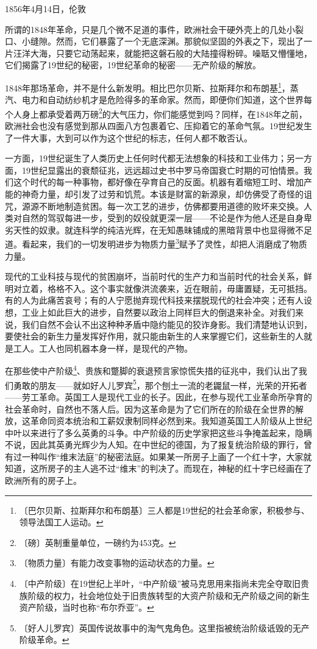 \documentclass[12pt,UTF-8,openany]{ctexbook}
\begin{document}
\begin{large}
    
    \begin{center}1856年4月14日，伦敦\end{center}
    
    所谓的1848年革命，只是几个微不足道的事件，欧洲社会干硬外壳上的几处小裂口、小缝隙。然而，它们暴露了一个无底深渊。那貌似坚固的外表之下，现出了一片汪洋大海，只要它动荡起来，就能把这磐石般的大陆撞得粉碎。噪聒又懵懂地，它们揭露了19世纪的秘密，19世纪革命的秘密——无产阶级的解放。
    
    1848年那场革命，并不是什么新发明。相比巴尔贝斯、拉斯拜尔和布朗基\footnote{〔巴尔贝斯、拉斯拜尔和布朗基〕三人都是19世纪的社会革命家，积极参与、领导法国工人运动。}，蒸汽、电力和自动纺纱机才是危险得多的革命家。然而，即便你们知道，这个世界每个人身上都承受着两万磅\footnote{〔磅〕英制重量单位，一磅约为453克。}的大气压力，你们能感觉到吗？同样，在1848年之前，欧洲社会也没有感觉到那从四面八方包裹着它、压抑着它的革命气氛。19世纪发生了一件大事，大到可以作为这个世纪的标志，任何人都不敢否认。
    
    一方面，19世纪诞生了人类历史上任何时代都无法想象的科技和工业伟力；另一方面，19世纪显露出的衰颓征兆，远远超过史书中罗马帝国衰亡时期的可怕情景。我们这个时代的每一种事物，都好像在孕育自己的反面。机器有着缩短工时、增加产能的神奇力量，却引发了过劳和饥荒。本该是财富的新源泉，却仿佛受了奇怪的诅咒，源源不断地制造贫困。每一次工艺的进步，仿佛都要用道德的败坏来交换。人类对自然的驾驭每进一步，受到的奴役就更深一层——不论是作为他人还是自身卑劣天性的奴隶。就连科学的纯洁光辉，在无知愚昧铺成的黑暗背景中也显得微不足道。看起来，我们的一切发明进步为物质力量\footnote{〔物质力量〕有能力改变事物的运动状态的力量。}赋予了灵性，却把人消磨成了物质力量。
    
    现代的工业科技与现代的贫困崩坏，当前时代的生产力和当前时代的社会关系，鲜明对立着，格格不入。这个事实就像洪流袭来，近在眼前，毋庸置疑，无可抵挡。有的人为此痛苦哀号；有的人宁愿抛弃现代科技来摆脱现代的社会冲突；还有人设想，工业上如此巨大的进步，自然要以政治上同样巨大的倒退来补全。对我们来说，我们自然不会认不出这种种矛盾中隐约能见的狡诈身影。我们清楚地认识到，要使社会的新生力量发挥好作用，就只能由新生的人来掌握它们，这些新生的人就是工人。工人也同机器本身一样，是现代的产物。
    
    在那些使中产阶级\footnote{〔中产阶级〕在19世纪上半叶，“中产阶级”被马克思用来指尚未完全夺取旧贵族阶级的权力，社会地位处于旧贵族转型的大资产阶级和无产阶级之间的新生资产阶级，当时也称“布尔乔亚”。}、贵族和蹩脚的衰退预言家惊慌失措的征兆中，我们认出了我们勇敢的朋友——就如好人儿罗宾\footnote{〔好人儿罗宾〕英国传说故事中的淘气鬼角色。这里指被统治阶级诋毁的无产阶级革命。}，那个刨土一流的老鼹鼠一样，光荣的开拓者——劳工革命。英国工人是现代工业的长子。因此，在参与现代工业革命所孕育的社会革命时，自然也不落人后。因为这革命是为了它们所在的阶级在全世界的解放，这革命同资本统治和工薪奴隶制同样必然到来。我知道英国工人阶级从上世纪中叶以来进行了多么英勇的斗争。中产阶级的历史学家把这些斗争掩盖起来，隐瞒不说，因此其英勇光辉少为人知。在中世纪的德国，为了报复统治阶级的罪行，曾有过一种叫作“维末法庭”的秘密法庭。如果某一所房子上画了一个红十字，大家就知道，这所房子的主人逃不过“维末”的判决了。而现在，神秘的红十字已经画在了欧洲所有的房子上。
    

\end{large}
\end{document}
